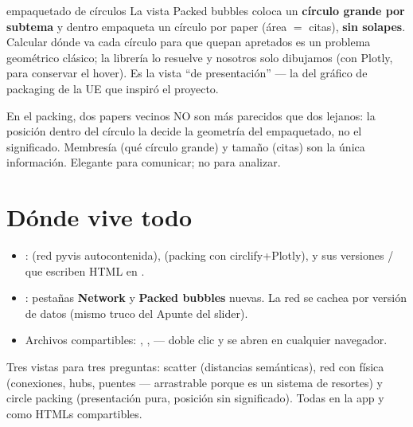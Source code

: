 \documentclass[11pt,a4paper]{article}
\begin{document}
\begin{concepto}{empaquetado de círculos}
La vista Packed bubbles coloca un \textbf{círculo grande por subtema} y dentro empaqueta un
círculo por paper (área $=$ citas), \textbf{sin solapes}. Calcular dónde va cada círculo para
que quepan apretados es un problema geométrico clásico; la librería  lo
resuelve y nosotros solo dibujamos (con Plotly, para conservar el hover). Es la vista
``de presentación'' — la del gráfico de packaging de la UE que inspiró el proyecto.
\end{concepto}

\begin{ojo}
En el packing, dos papers vecinos NO son más parecidos que dos lejanos: la posición dentro
del círculo la decide la geometría del empaquetado, no el significado. Membresía (qué círculo
grande) y tamaño (citas) son la única información. Elegante para comunicar; no para analizar.
\end{ojo}

\section{Dónde vive todo}

\begin{itemize}
  \item {}:  (red pyvis autocontenida),
         (packing con circlify+Plotly), y sus versiones
        / que escriben HTML en .
  \item {}: pestañas \textbf{Network} y \textbf{Packed bubbles} nuevas. La red
        se cachea por versión de datos (mismo truco del Apunte del slider).
  \item Archivos compartibles: , ,
         — doble clic y se abren en cualquier navegador.
\end{itemize}

\begin{resumen}
Tres vistas para tres preguntas: scatter (distancias semánticas), red con física (conexiones,
hubs, puentes — arrastrable porque es un sistema de resortes) y circle packing (presentación
pura, posición sin significado). Todas en la app y como HTMLs compartibles.
\end{resumen}
\end{document}
